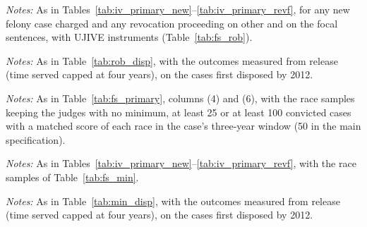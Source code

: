 \documentclass[11pt]{article}
\newcommand{\tabnote}[1]{\par\vspace{0.6ex}\begin{minipage}{\linewidth}\linespread{1}\footnotesize\textit{Notes:} #1\end{minipage}}
\begin{document}
\begin{table}[H]
\centering
\caption{2SLS from the disposition with UJIVE instruments}\label{tab:rob_disp}
{\small\linespread{1}\selectfont\renewcommand{\arraystretch}{0.9}}
\tabnote{As in Tables~\ref{tab:iv_primary_new}--\ref{tab:iv_primary_revf}, for any new felony case charged and any revocation proceeding on other and on the focal sentences, with UJIVE instruments (Table~\ref{tab:fs_rob}).}
\end{table}

\begin{table}[H]
\centering
\caption{2SLS from release with UJIVE instruments}\label{tab:rob_rel}
{\small\linespread{1}\selectfont\renewcommand{\arraystretch}{0.9}}
\tabnote{As in Table~\ref{tab:rob_disp}, with the outcomes measured from release (time served capped at four years), on the cases first disposed by 2012.}
\end{table}

\begin{table}[H]
\centering
\caption{First stages by the minimum number of cases per race and judge}\label{tab:fs_min}
{\small\resizebox{\textwidth}{!}{}}
\tabnote{As in Table~\ref{tab:fs_primary}, columns (4) and (6), with the race samples keeping the judges with no minimum, at least 25 or at least 100 convicted cases with a matched score of each race in the case's three-year window (50 in the main specification).}
\end{table}

\begin{table}[H]
\centering
\caption{2SLS from the disposition by the minimum number of cases per race and judge}\label{tab:min_disp}
{\small\linespread{1}\selectfont\renewcommand{\arraystretch}{0.9}\resizebox{\textwidth}{!}{}}
\tabnote{As in Tables~\ref{tab:iv_primary_new}--\ref{tab:iv_primary_revf}, with the race samples of Table~\ref{tab:fs_min}.}
\end{table}

\begin{table}[H]
\centering
\caption{2SLS from release by the minimum number of cases per race and judge}\label{tab:min_rel}
{\small\linespread{1}\selectfont\renewcommand{\arraystretch}{0.9}\resizebox{\textwidth}{!}{}}
\tabnote{As in Table~\ref{tab:min_disp}, with the outcomes measured from release (time served capped at four years), on the cases first disposed by 2012.}
\end{table}
\end{document}
